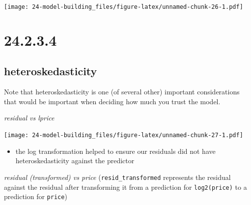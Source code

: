 \documentclass[]{book}
\newenvironment{Shaded}{\begin{snugshade}}{\end{snugshade}}
\newcommand{\DataTypeTok}[1]{\textcolor[rgb]{0.13,0.29,0.53}{#1}}
\newcommand{\DecValTok}[1]{\textcolor[rgb]{0.00,0.00,0.81}{#1}}
\newcommand{\KeywordTok}[1]{\textcolor[rgb]{0.13,0.29,0.53}{\textbf{#1}}}
\newcommand{\NormalTok}[1]{#1}
\newcommand{\OperatorTok}[1]{\textcolor[rgb]{0.81,0.36,0.00}{\textbf{#1}}}
\newcommand{\StringTok}[1]{\textcolor[rgb]{0.31,0.60,0.02}{#1}}
\providecommand{\tightlist}{%
  \setlength{\itemsep}{0pt}\setlength{\parskip}{0pt}}
\theoremstyle{definition}
\theoremstyle{definition}
\theoremstyle{definition}
\theoremstyle{remark}
\begin{document}
\texttt{[image: 24-model-building\_files/figure-latex/unnamed-chunk-26-1.pdf]}

\hypertarget{section-85}{%
\section{24.2.3.4}\label{section-85}}

\hypertarget{heteroskedasticity}{%
\subsection{heteroskedasticity}\label{heteroskedasticity}}

Note that heteroskedasticity is one (of several other) important
considerations that would be important when deciding how much you trust
the model.

\emph{residual vs lprice}

\begin{Shaded}
\end{Shaded}

\texttt{[image: 24-model-building\_files/figure-latex/unnamed-chunk-27-1.pdf]}

\begin{itemize}
\tightlist
\item
  the log transformation helped to ensure our residuals did not have
  heteroskedasticity against the predictor
\end{itemize}

\emph{residual (transformed) vs price} (\texttt{resid\_transformed}
represents the residual against the residual after transforming it from
a prediction for \texttt{log2(price)} to a prediction for
\texttt{price})

\begin{Shaded}
\end{Shaded}
\end{document}
